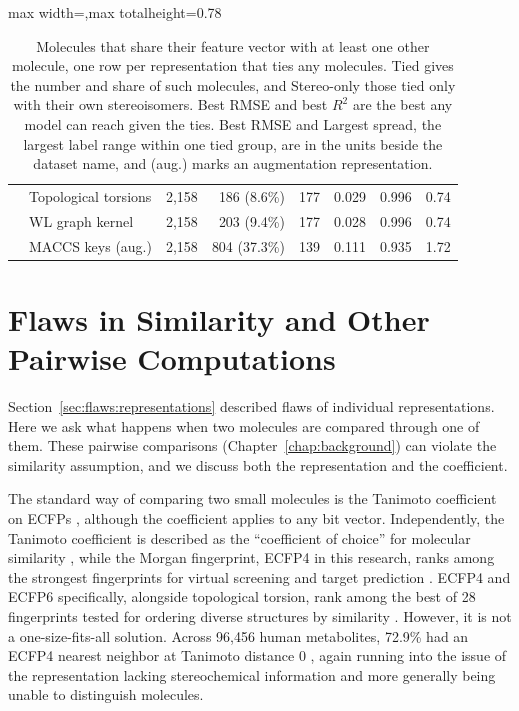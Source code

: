 \begin{table}[htbp]
\begin{adjustbox}{max width=\textwidth,max totalheight=0.78\textheight}
\begin{tabular}{llrrrrrr}
 & Topological torsions & 2,158 & 186 (8.6\%) & 177 & 0.029 & 0.996 & 0.74 \\
 & WL graph kernel & 2,158 & 203 (9.4\%) & 177 & 0.028 & 0.996 & 0.74 \\
 & MACCS keys (aug.) & 2,158 & 804 (37.3\%) & 139 & 0.111 & 0.935 & 1.72 \\
\bottomrule
\end{tabular}
\end{adjustbox}
\caption[Molecules that share a feature vector with another molecule.]{Molecules that share their feature vector with at least one other molecule, one row per representation that ties any molecules. Tied gives the number and share of such molecules, and Stereo-only those tied only with their own stereoisomers. Best RMSE and best $R^2$ are the best any model can reach given the ties. Best RMSE and Largest spread, the largest label range within one tied group, are in the units beside the dataset name, and (aug.) marks an augmentation representation.}
\label{tab:flaws:ties}
\end{table}





\section{Flaws in Similarity and Other Pairwise Computations}\label{sec:flaws:similarity} %

Section~\ref{sec:flaws:representations} described flaws of individual representations. Here we ask what happens when two molecules are compared through one of them. These pairwise comparisons (Chapter~\ref{chap:background}) can violate the similarity assumption, and we discuss both the representation and the coefficient.


The standard way of comparing two small molecules is the Tanimoto coefficient on ECFPs \citep{LopezPerez2024}, although the coefficient applies to any bit vector. Independently, the Tanimoto coefficient is described as the ``coefficient of choice'' for molecular similarity \citep{Bajusz2015}, while the Morgan fingerprint, ECFP4 in this research, ranks among the strongest fingerprints for virtual screening and target prediction \citep{Capecchi2020}. ECFP4 and ECFP6 specifically, alongside topological torsion, rank among the best of 28 fingerprints tested for ordering diverse structures by similarity \citep{OBoyle2016}. However, it is not a one-size-fits-all solution. Across 96,456 human metabolites, 72.9\% had an ECFP4 nearest neighbor at Tanimoto distance 0 \citep{Capecchi2020}, again running into the issue of the representation lacking stereochemical information and more generally being unable to distinguish molecules. 

